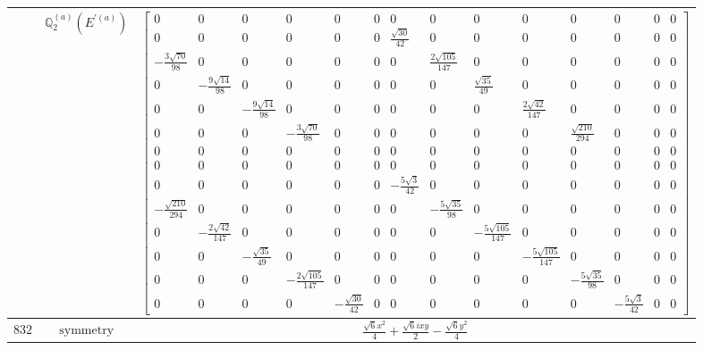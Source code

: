 \documentclass[fleqn,8pt,landscape]{jsarticle}
\begin{document}
\begin{longtable}{ccc}
$  $ & $ \mathbb{Q}_{2}^{(a)}(E^{\prime(a)}) $ & $ \begin{bmatrix} 0 & 0 & 0 & 0 & 0 & 0 & 0 & 0 & 0 & 0 & 0 & 0 & 0 & 0 \\ 0 & 0 & 0 & 0 & 0 & 0 & \frac{\sqrt{30}}{42} & 0 & 0 & 0 & 0 & 0 & 0 & 0 \\ - \frac{3 \sqrt{70}}{98} & 0 & 0 & 0 & 0 & 0 & 0 & \frac{2 \sqrt{105}}{147} & 0 & 0 & 0 & 0 & 0 & 0 \\ 0 & - \frac{9 \sqrt{14}}{98} & 0 & 0 & 0 & 0 & 0 & 0 & \frac{\sqrt{35}}{49} & 0 & 0 & 0 & 0 & 0 \\ 0 & 0 & - \frac{9 \sqrt{14}}{98} & 0 & 0 & 0 & 0 & 0 & 0 & \frac{2 \sqrt{42}}{147} & 0 & 0 & 0 & 0 \\ 0 & 0 & 0 & - \frac{3 \sqrt{70}}{98} & 0 & 0 & 0 & 0 & 0 & 0 & \frac{\sqrt{210}}{294} & 0 & 0 & 0 \\ 0 & 0 & 0 & 0 & 0 & 0 & 0 & 0 & 0 & 0 & 0 & 0 & 0 & 0 \\ 0 & 0 & 0 & 0 & 0 & 0 & 0 & 0 & 0 & 0 & 0 & 0 & 0 & 0 \\ 0 & 0 & 0 & 0 & 0 & 0 & - \frac{5 \sqrt{3}}{42} & 0 & 0 & 0 & 0 & 0 & 0 & 0 \\ - \frac{\sqrt{210}}{294} & 0 & 0 & 0 & 0 & 0 & 0 & - \frac{5 \sqrt{35}}{98} & 0 & 0 & 0 & 0 & 0 & 0 \\ 0 & - \frac{2 \sqrt{42}}{147} & 0 & 0 & 0 & 0 & 0 & 0 & - \frac{5 \sqrt{105}}{147} & 0 & 0 & 0 & 0 & 0 \\ 0 & 0 & - \frac{\sqrt{35}}{49} & 0 & 0 & 0 & 0 & 0 & 0 & - \frac{5 \sqrt{105}}{147} & 0 & 0 & 0 & 0 \\ 0 & 0 & 0 & - \frac{2 \sqrt{105}}{147} & 0 & 0 & 0 & 0 & 0 & 0 & - \frac{5 \sqrt{35}}{98} & 0 & 0 & 0 \\ 0 & 0 & 0 & 0 & - \frac{\sqrt{30}}{42} & 0 & 0 & 0 & 0 & 0 & 0 & - \frac{5 \sqrt{3}}{42} & 0 & 0 \end{bmatrix} $ \\ \hline
$ 832 $ & $ \text{symmetry} $ & $ \frac{\sqrt{6} x^{2}}{4} + \frac{\sqrt{6} i x y}{2} - \frac{\sqrt{6} y^{2}}{4} $ \\

\end{longtable}
\end{document}
